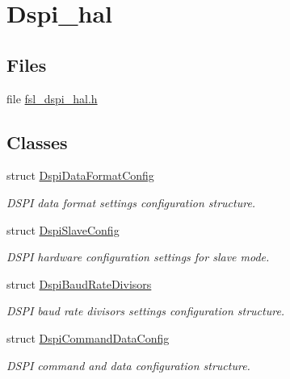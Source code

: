 \hypertarget{group__dspi__hal}{}\section{Dspi\+\_\+hal}
\label{group__dspi__hal}
\subsection*{Files}
\begin{DoxyCompactItemize}
\item 
file \hyperlink{fsl__dspi__hal_8h}{fsl\+\_\+dspi\+\_\+hal.\+h}
\end{DoxyCompactItemize}
\subsection*{Classes}
\begin{DoxyCompactItemize}
\item 
struct \hyperlink{structDspiDataFormatConfig}{Dspi\+Data\+Format\+Config}
\begin{DoxyCompactList}\small\item\em D\+S\+PI data format settings configuration structure. \end{DoxyCompactList}\item 
struct \hyperlink{structDspiSlaveConfig}{Dspi\+Slave\+Config}
\begin{DoxyCompactList}\small\item\em D\+S\+PI hardware configuration settings for slave mode. \end{DoxyCompactList}\item 
struct \hyperlink{structDspiBaudRateDivisors}{Dspi\+Baud\+Rate\+Divisors}
\begin{DoxyCompactList}\small\item\em D\+S\+PI baud rate divisors settings configuration structure. \end{DoxyCompactList}\item 
struct \hyperlink{structDspiCommandDataConfig}{Dspi\+Command\+Data\+Config}
\begin{DoxyCompactList}\small\item\em D\+S\+PI command and data configuration structure. \end{DoxyCompactList}\end{DoxyCompactItemize}
